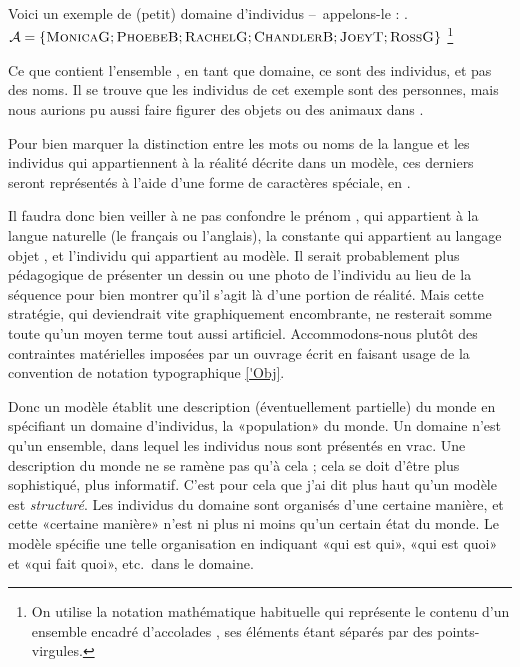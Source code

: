 Voici un exemple de (petit) domaine d'individus --~appelons-le  :
\ex.  
\(\mathcal{A} = \{ \textsc{MonicaG};
  \textsc{PhoebeB};\textsc{RachelG};\textsc{ChandlerB};\textsc{JoeyT};\textsc{RossG} \}\)%
\footnote{On utilise la notation mathématique habituelle qui
  représente le contenu d'un ensemble encadré d'accolades \set{\,},
  ses éléments étant séparés par des points-virgules.}


Ce que contient l'ensemble , en tant que domaine, ce sont des
individus, et pas des noms.  Il se trouve que les individus de cet
exemple sont des 
personnes, mais nous aurions pu aussi faire figurer des objets ou des
animaux dans .

\begin{nota}\label{'Obj}
Pour bien marquer la distinction entre les mots ou noms de la
   langue et les individus qui appartiennent à la réalité décrite dans
   un modèle, ces derniers seront représentés à l'aide d'une
   {forme de caractères spéciale}, en  . %
\end{nota}

Il faudra donc bien veiller à ne pas confondre le prénom ,
qui appartient à la langue naturelle (le français ou l'anglais), la
constante  qui appartient au langage objet {\LO}, et l'individu
 qui appartient au modèle.  Il serait probablement plus
pédagogique de présenter un dessin ou une photo de l'individu au lieu
de la séquence  pour bien montrer qu'il s'agit là d'une portion de
réalité.  Mais cette stratégie, qui deviendrait vite graphiquement
encombrante, ne resterait somme toute qu'un moyen terme tout aussi
artificiel. 
Accommodons-nous plutôt des contraintes matérielles
imposées par un ouvrage écrit en faisant usage de la convention de
notation typographique \ref{'Obj}. 

Donc un modèle établit une description (éventuellement partielle) du
monde en spécifiant un domaine d'individus, la «population» du
monde.   Un domaine n'est qu'un ensemble, dans lequel les individus
nous sont présentés en vrac.  Une description du monde ne se ramène
pas qu'à cela ; cela se doit d'être plus sophistiqué, plus informatif.
C'est pour cela que j'ai dit plus haut qu'un modèle est
\emph{structuré}.  Les individus du domaine sont organisés
d'une certaine manière, et cette «certaine manière» n'est ni plus
ni moins qu'un certain état du monde.
Le modèle spécifie une telle organisation en indiquant  «qui est
qui», «qui est quoi» et «qui 
fait quoi», etc.\ dans le domaine.  

